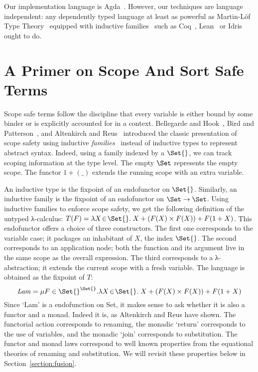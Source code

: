 \medskip

Our implementation language is
Agda~\cite{norell2009dependently}. However, our techniques are
language independent: any dependently typed language at least as
powerful as Martin-L\"of Type Theory~\cite{martin1982constructive}
equipped with inductive families~\cite{dybjer1994inductive} such as
Coq~\cite{Coq:manual}, Lean~\cite{DBLP:conf/cade/MouraKADR15} or
Idris~\cite{brady2013idris} ought to do.



\section{A Primer on Scope And Sort Safe Terms}\label{section:primer-term}

Scope safe terms follow the discipline that every variable is
either bound by some binder or is explicitly accounted for in a
context. Bellegarde and Hook~\citeyear{BELLEGARDE1994287}, Bird and Patterson~\citeyear{bird_paterson_1999},
and Altenkirch and Reus~\citeyear{altenkirch1999monadic} introduced the
classic presentation of scope safety using inductive
\emph{families}~\cite{dybjer1994inductive} instead of inductive types to
represent abstract syntax. Indeed, using a family indexed by a $\Set{}$,
we can track scoping information at the type level. The empty $\Set$ represents the empty scope. The functor
$1 + (\_)$ extends the running scope with an extra variable.

An inductive type is the fixpoint of an endofunctor on $\Set{}$.
Similarly, an inductive family is the fixpoint of an endofunctor on
$\Set \to \Set$. Using inductive families to enforce scope safety, we
get the following definition of the untyped λ-calculus: $T(F)
= \lambda X \!\in\! \Set{}.\; X + (F(X) \times F(X)) + F(1 + X)$.
This endofunctor offers a choice of three constructors.  The first one
corresponds to the variable case; it packages an inhabitant of $X$,
the index $\Set{}$. The second corresponds to an application node;
both the function and its argument live in the same scope as the
overall expression. The third corresponds to a λ-abstraction;
it extends the current scope with a fresh variable.  The language is
obtained as the fixpoint of $T$:
\[
   \mathit{Lam} = \mu F \in \Set{}^{\Set{}}.
   \lambda X \!\in\! \Set{}.\; X + (F(X) \times F(X)) + F(1 + X)
\]
Since `Lam' is a endofunction on Set, it makes
sense to ask whether it is also a functor and a monad. Indeed it is,
as Altenkirch and Reus have shown. The functorial action corresponds
to renaming, the monadic `return' corresponds to the use of variables,
and the monadic `join' corresponds to substitution. The functor and
monad laws correspond to well known properties from the equational
theories of renaming and substitution. We will revisit these properties
below in Section~\ref{section:fusion}.

